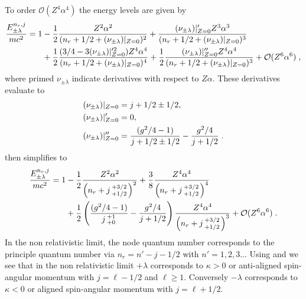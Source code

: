 To order $\mathcal{O}(Z^{4}\alpha^{4})$ the energy levels are given by
\begin{alignat}{1}
\label{nonrel01} \frac{E^{n_{r},j}_{\pm\lambda}}{mc^{2}}=1&-\frac{1}{2}\frac{Z^{2}\alpha^{2}}{(n_{r}+1/2+(\nu_{\pm\lambda})|_{Z=0})^{2}}+\frac{(\nu_{\pm\lambda})|_{Z=0}'Z^{3}\alpha^{3}}{(n_{r}+1/2+(\nu_{\pm\lambda})|_{Z=0})^{3}}\\ 
\notag&+\frac{1}{2}\frac{(3/4-3(\nu_{\pm\lambda})|_{Z=0}'^{2})Z^{4}\alpha^{4}}{(n_{r}+1/2+(\nu_{\pm\lambda})|_{Z=0})^{4}}+\frac{1}{2}\frac{(\nu_{\pm\lambda})|_{Z=0}^{\prime\prime} Z^{4}\alpha^{4}}{(n_{r}+1/2+(\nu_{\pm\lambda})|_{Z=0})^{3}}+\mathcal{O}(Z^{6}\alpha^{6})\;,\end{alignat}
where primed $\nu_{\pm\lambda}$ indicate derivatives with respect to $Z\alpha$. These derivatives evaluate to
\begin{alignat}{1}
\label{nonrel02} &(\nu_{\pm\lambda})|_{Z=0}=j+1/2\pm1/2,\\ \notag &(\nu_{\pm\lambda})|_{Z=0}'=0,\\ \notag &(\nu_{\pm\lambda})|_{Z=0}^{\prime\prime}=\frac{(g^{2}/4-1)}{j+1/2\pm1/2}-\frac{g^{2}/4}{j+1/2}\;.
\end{alignat}
 then simplifies to
\begin{alignat}{1}
\label{nonrel03} \frac{E^{n_{r},j}_{\pm\lambda}}{mc^{2}}=1&-\frac{1}{2}\frac{Z^{2}\alpha^{2}}{\left(n_{r}+j\begin{smallmatrix}+3/2 \\ +1/2\end{smallmatrix}\right)^{2}}+\frac{3}{8}\frac{Z^{4}\alpha^{4}}{\left(n_{r}+j\begin{smallmatrix}+3/2 \\ +1/2\end{smallmatrix}\right)^{4}}\\ 
\notag &+\frac{1}{2}\left(\frac{(g^{2}/4-1)}{j\begin{smallmatrix}+1 \\ +0\end{smallmatrix}}-\frac{g^{2}/4}{j+1/2}\right)\frac{Z^{4}\alpha^{4}}{\left(n_{r}+j\begin{smallmatrix}+3/2 \\ +1/2\end{smallmatrix}\right)^{3}}+\mathcal{O}(Z^{6}\alpha^{6})\;.
\end{alignat}
In the non relativistic limit, the node quantum number corresponds to the principle quantum number via $n_{r}=n'-j-1/2$ with $n'=1,2,3\ldots$ Using  and  we see that in the non relativistic limit $+\lambda$ corresponds to $\kappa>0$ or anti-aligned spin-angular momentum with $j=\ell-1/2$ and $\ell\geq1$. Conversely $-\lambda$ corresponds to $\kappa<0$ or aligned spin-angular momentum with $j=\ell+1/2$. 


